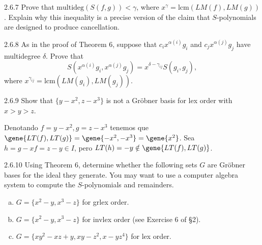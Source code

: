 \documentclass[twoside]{article}
\begin{document}
\newpage

\begin{ejercicio}{2.6.7}
Prove that $\mathrm{multideg}(S( f , g)) < γ$, where $x^γ = \mathrm{lcm}(LM( f ), LM(g))$. Explain why this
inequality is a precise version of the claim that $S$-polynomials are designed to produce
cancellation.
\end{ejercicio}
\begin{solucion}

\end{solucion}

\newpage

\begin{ejercicio}{2.6.8}
As in the proof of Theorem 6, suppose that $c_ix^{α(i)}g_i$ and $c_jx^{α(j)}g_j$ have multidegree $δ$.
Prove that
$$S(x^{α(i)}g_i, x^{α(j)}g_j) = x^{δ−γ_{ij}}S(g_i, g_j),$$
where $x^{γ_{ij}} = \mathrm{lcm}(LM(g_i), LM(g_j))$.
\end{ejercicio}
\begin{solucion}

\end{solucion}

\newpage

\begin{ejercicio}{2.6.9}
Show that $\{y − x^2, z − x^3\}$ is not a Gröbner basis for lex order with $x > y > z$.
\end{ejercicio}
\begin{solucion}
Denotando $f=y − x^2,g=z − x^3$ tenemos que $\gene{LT(f),LT(g)}=\gene{-x^2,-x^3}=\gene{x^2}$. Sea $h=g-xf=z-y\in I$, pero $LT(h)=-y\notin\gene{LT(f),LT(g)}$.
\end{solucion}

\newpage

\begin{ejercicio}{2.6.10}
Using Theorem 6, determine whether the following sets $G$ are Gröbner bases for the
ideal they generate. You may want to use a computer algebra system to compute the
$S$-polynomials and remainders.
\begin{enumerate}[a.]
\item $G = \{x^2 − y, x^3 − z\}$ for grlex order.
\item $G = \{x^2 − y, x^3 − z\}$ for invlex order (see Exercise 6 of §2).
\item $G = \{xy^2 − xz + y, xy − z^2, x − yz^4\}$ for lex order.
\end{enumerate}
\end{ejercicio}
\begin{solucion}

\end{solucion}
\end{document}
